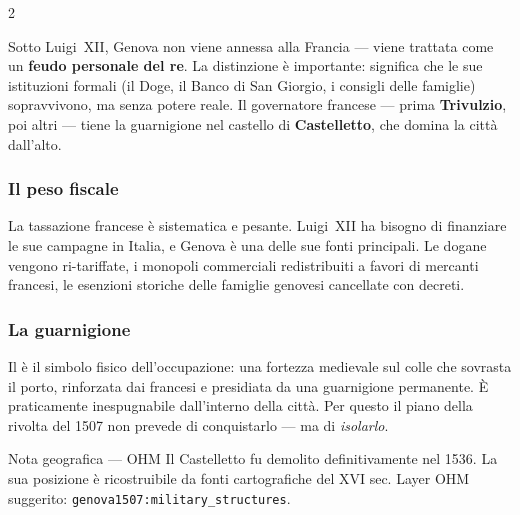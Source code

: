 
\begin{multicols}{2}

Sotto Luigi~XII, Genova non viene annessa alla Francia — viene trattata
come un \textbf{feudo personale del re}. La distinzione è importante:
significa che le sue istituzioni formali (il Doge, il Banco di San Giorgio,
i consigli delle famiglie) sopravvivono, ma senza potere reale.
Il governatore francese — prima \textbf{Trivulzio}, poi altri — tiene
la guarnigione nel castello di \textbf{Castelletto}, che domina la città
dall'alto.

\subsubsection{Il peso fiscale}

La tassazione francese è sistematica e pesante. Luigi~XII ha bisogno di
finanziare le sue campagne in Italia, e Genova è una delle sue fonti
principali. Le dogane vengono ri-tariffate, i monopoli commerciali
redistribuiti a favori di mercanti francesi, le esenzioni storiche
delle famiglie genovesi cancellate con decreti.

\columnbreak

\subsubsection{La guarnigione}


Il  è il simbolo fisico dell'occupazione: una
fortezza medievale sul colle che sovrasta il porto, rinforzata dai
francesi e presidiata da una guarnigione permanente. È praticamente
inespugnabile dall'interno della città. Per questo il piano della
rivolta del 1507 non prevede di conquistarlo — ma di \textit{isolarlo}.

\begin{rulebox}[SharedBrown]{Nota geografica — OHM}
Il Castelletto fu demolito definitivamente nel 1536.
La sua posizione è ricostruibile da fonti cartografiche del XVI sec.
Layer OHM suggerito: \texttt{genova1507:military\_structures}.
\end{rulebox}

\end{multicols}

